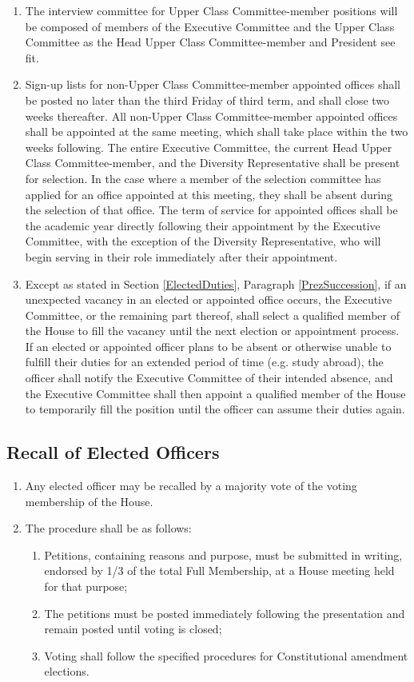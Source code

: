 \documentclass[10pt]{article} %
\begin{document}
\begin{enumerate}
\item The interview committee for Upper Class Committee-member positions will be composed of members of the Executive Committee and the Upper Class Committee as the Head Upper Class Committee-member and President see fit.
\item Sign-up lists for non-Upper Class Committee-member appointed offices shall be posted no later than the third Friday of third term, and shall close two weeks thereafter. All non-Upper Class Committee-member appointed offices shall be appointed at the same meeting, which shall take place within the two weeks following. The entire Executive Committee, the current Head Upper Class Committee-member, and the Diversity Representative shall be present for selection. In the case where a member of the selection committee has applied for an office appointed at this meeting, they shall be absent during the selection of that office. The term of service for appointed offices shall be the academic year directly following their appointment by the Executive Committee, with the exception of the Diversity Representative, who will begin serving in their role immediately after their appointment.
\item \label{Vacancy} Except as stated in Section \ref{ElectedDuties}, Paragraph \ref{PrezSuccession}, if an unexpected vacancy in an elected or appointed office occurs, the Executive Committee, or the remaining part thereof, shall select a qualified member of the House to fill the vacancy until the next election or appointment process. If an elected or appointed officer plans to be absent or otherwise unable to fulfill their duties for an extended period of time (e.g. study abroad), the officer shall notify the Executive Committee of their intended absence, and the Executive Committee shall then appoint a qualified member of the House to temporarily fill the position until the officer can assume their duties again.
\end{enumerate}
\subsection{Recall of Elected Officers}
\begin{enumerate}
\item Any elected officer may be recalled by a majority vote of the voting membership of the House. 
\item The procedure shall be as follows:
\begin{enumerate}
\item Petitions, containing reasons and purpose, must be submitted in writing, endorsed by 1/3 of the total Full Membership, at a House meeting held for that purpose;
\item The petitions must be posted immediately following the presentation and remain posted until voting is closed;
\item Voting shall follow the specified procedures for Constitutional amendment elections.
\end{enumerate}
\end{enumerate}
\end{document}
